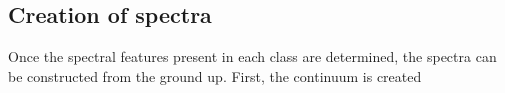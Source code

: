 \subsection{Creation of spectra}
\label{ssec:creation}
Once the spectral features present in each class are determined, the spectra can 
be constructed from the ground up. First, the continuum is created 


